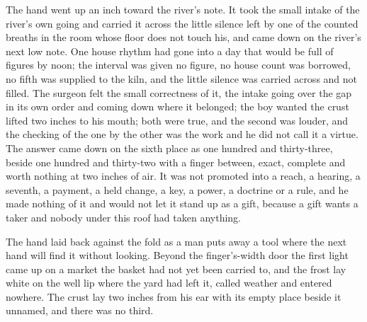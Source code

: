 The hand went up an inch toward the river's note. It took the small intake of the river's own going and carried it across the little silence left by one of the counted breaths in the room whose floor does not touch his, and came down on the river's next low note. One house rhythm had gone into a day that would be full of figures by noon; the interval was given no figure, no house count was borrowed, no fifth was supplied to the kiln, and the little silence was carried across and not filled. The surgeon felt the small correctness of it, the intake going over the gap in its own order and coming down where it belonged; the boy wanted the crust lifted two inches to his mouth; both were true, and the second was louder, and the checking of the one by the other was the work and he did not call it a virtue. The answer came down on the sixth place as one hundred and thirty-three, beside one hundred and thirty-two with a finger between, exact, complete and worth nothing at two inches of air. It was not promoted into a reach, a hearing, a seventh, a payment, a held change, a key, a power, a doctrine or a rule, and he made nothing of it and would not let it stand up as a gift, because a gift wants a taker and nobody under this roof had taken anything.

The hand laid back against the fold as a man puts away a tool where the next hand will find it without looking. Beyond the finger's-width door the first light came up on a market the basket had not yet been carried to, and the frost lay white on the well lip where the yard had left it, called weather and entered nowhere. The crust lay two inches from his ear with its empty place beside it unnamed, and there was no third.
